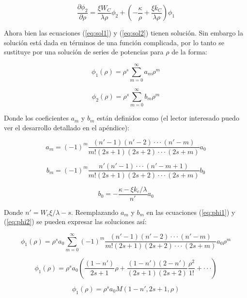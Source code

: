 \documentclass[a4paper, 12pt]{article} %
\begin{document}
\begin{equation}\label{eq:sol2}
\dfrac{\partial \phi_2}{\partial \rho} = \dfrac{\xi W_C}{\lambda  \rho} \phi_2 
+ \left( -\dfrac{\kappa}{\rho} + \dfrac{\xi k_C}{\lambda \rho}  \right)\phi_1
\end{equation}

Ahora bien las ecuaciones (\ref{eq:sol1}) y (\ref{eq:sol2}) tienen soluci\'on. 
Sin embargo la soluci\'on est\'a dada en t\'erminos de una funci\'on complicada, 
por lo tanto se sustituye por una soluci\'on de series de potencias para 
$\rho$ de la forma:

\begin{equation}\label{eq:phi1}
\phi_1(\rho) = \rho^s \sum \limits_{m=0}^{\infty} a_m \rho^m
\end{equation}


\begin{equation} \label{eq:phi2}
\phi_2(\rho) = \rho^s \sum \limits_{m=0}^{\infty} b_m \rho^m
\end{equation}

Donde los coeficientes $a_m$ y $b_m$ est\'an definidos como (el lector interesado 
puedo ver el desarrollo detallado en el ap\'endice):

\begin{equation}
a_m = (-1)^m \dfrac{(n'-1)(n'-2)\cdot\cdot\cdot(n'-m)}{m!(2s+1)(2s+2)\cdot\cdot\cdot(2s+m)}a_0
\end{equation}

\begin{equation}
b_m = (-1)^m \dfrac{n'(n'-1)\cdot\cdot\cdot(n'-m+1)}{m!(2s+1)(2s+2)\cdot\cdot\cdot(2s+m)}b_0
\end{equation}

\begin{equation}
b_0 = -\dfrac{\kappa - \xi k_c /\lambda}{n'}a_0
\end{equation}

Donde $n' = W_c\xi/\lambda - s$. Reemplazando $a_m$ y $b_m$ en las ecuaciones (\ref{eq:phi1}) y (\ref{eq:phi2})
se pueden expresar las soluciones as\'i:

\[
\phi_1(\rho) = \rho^s a_0 \sum  \limits_{m=0}^{\infty} (-1)^m \dfrac{(n'-1)(n'-2)\cdot\cdot\cdot(n'-m)}{m!(2s+1)(2s+2)\cdot\cdot\cdot(2s+m)}a_0 \rho^m 
\]

\[
\phi_1(\rho) = \rho^s a_0 \left( \dfrac{(1-n')}{2s+1} \rho + \dfrac{(1-n')(2-n')}{(2s+1)(2s+2)}\dfrac{\rho^2}{1!} + \cdot\cdot\cdot  \right)
\]

\begin{equation}\label{eq:sol1}
\phi_1(\rho) = 	\rho^s a_0 M(1-n',2s+1,\rho)
\end{equation}
\end{document}
